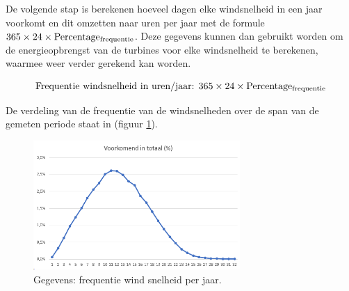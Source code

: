 De volgende stap is berekenen hoeveel dagen elke windsnelheid in een jaar voorkomt en dit omzetten naar uren per jaar met de formule \(365 \times 24 \times \text{Percentage\textsubscript{frequentie}}\). Deze gegevens kunnen dan gebruikt worden om de energieopbrengst van de turbines voor elke windsnelheid te berekenen, waarmee weer verder gerekend kan worden.


\begin{equation} \label{eq:7}
\text{Frequentie windsnelheid in uren/jaar: } 365\times 24\times \text{Percentage\textsubscript{frequentie}}
\end{equation}


De verdeling van de frequentie van de windsnelheden over de span van de gemeten periode\cite{WindData} staat in (figuur \ref{fig:Windfrequentie}).
\begin{figure}[H]
\centering
\includegraphics[width=0.7\textwidth]{IMG/data/overzicht/Windfrequentie.png}
\caption{Gegevens: frequentie wind snelheid per jaar.}
\label{fig:Windfrequentie}
\end{figure}

